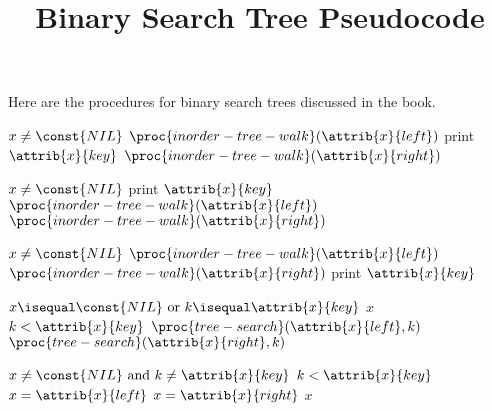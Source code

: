 \documentclass{article}
\title{Binary Search Tree Pseudocode}
\author{}
\date{}
\begin{document}
\maketitle

Here are the procedures for binary search trees discussed in the book.

\begin{codebox}
\li \If $x \neq \const{NIL}$
\li \Then
        $\proc{inorder-tree-walk}(\attrib{x}{left})$
\li     print $\attrib{x}{key}$
\li     $\proc{inorder-tree-walk}(\attrib{x}{right})$
\end{codebox}

\begin{codebox}
\li \If $x \neq \const{NIL}$
\li \Then
        print $\attrib{x}{key}$
\li     $\proc{inorder-tree-walk}(\attrib{x}{left})$
\li     $\proc{inorder-tree-walk}(\attrib{x}{right})$
\end{codebox}

\begin{codebox}
\li \If $x \neq \const{NIL}$
\li \Then
        $\proc{inorder-tree-walk}(\attrib{x}{left})$
\li     $\proc{inorder-tree-walk}(\attrib{x}{right})$
\li     print $\attrib{x}{key}$
\end{codebox}

\begin{codebox}
\li \If $x \isequal \const{NIL} \text{ or } k \isequal \attrib{x}{key}$
\li \Then
        \Return $x$
    \End
\li \If $k < \attrib{x}{key}$ 
\li \Then
        \Return $\proc{tree-search}(\attrib{x}{left}, k)$
\li \Else
\li     \Return $\proc{tree-search}(\attrib{x}{right}, k)$
    \End
\end{codebox}

\begin{codebox}
\li \While $x \neq \const{NIL} \text{ and } k \neq \attrib{x}{key}$
    \Do
\li     \If $k < \attrib{x}{key}$ 
        \Then
\li         $x = \attrib{x}{left}$
\li     \Else
\li         $x = \attrib{x}{right}$ 
        \End
    \End
\li \Return $x$
\end{codebox}
\end{document}
